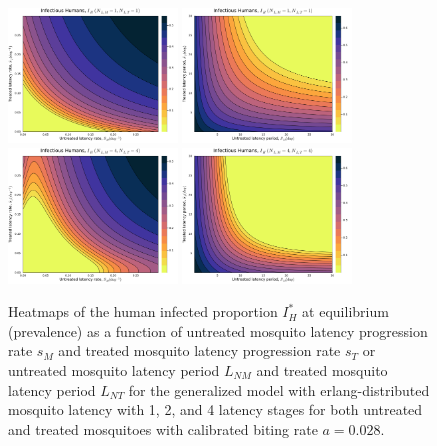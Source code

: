 \documentclass[11pt]{article}
\begin{document}
\begin{figure}[H]
  \centering
  \includegraphics[width=0.4\textwidth]{../../fig/Ih_rates_SMxST_1x1_cal.pdf}
  \includegraphics[width=0.4\textwidth]{../../fig/Ih_periods_SMxST_1x1_cal.pdf}\\
  \includegraphics[width=0.4\textwidth]{../../fig/Ih_rates_SMxST_4x4_cal.pdf}
  \includegraphics[width=0.4\textwidth]{../../fig/Ih_periods_SMxST_4x4_cal.pdf}
  \caption{Heatmaps of the human infected proportion $I_H^*$ at equilibrium (prevalence) as a function of untreated mosquito latency progression rate $s_M$ and treated mosquito latency progression rate $s_T$ or untreated mosquito latency period $L_{NM}$ and treated mosquito latency period $L_{NT}$ for the generalized model with erlang-distributed mosquito latency with 1, 2, and 4 latency stages for both untreated and treated mosquitoes with calibrated biting rate $a=0.028$.}
\end{figure}
\end{document}
